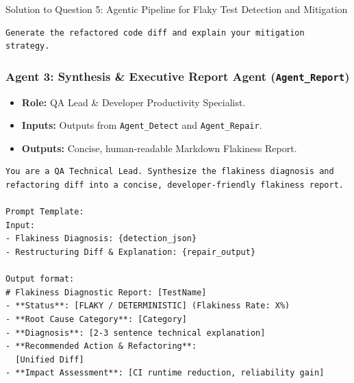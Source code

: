 \documentclass[11pt,a4paper]{article}
\begin{document}
\begin{solutionbox}{Solution to Question 5: Agentic Pipeline for Flaky Test Detection and Mitigation}
\begin{lstlisting}[style=promptstyle]
Generate the refactored code diff and explain your mitigation strategy.
\end{lstlisting}

\subsubsection*{Agent 3: Synthesis \& Executive Report Agent (\texttt{Agent\_Report})}
\begin{itemize}[leftmargin=1.5em,itemsep=1pt]
    \item \textbf{Role:} QA Lead \& Developer Productivity Specialist.
    \item \textbf{Inputs:} Outputs from \texttt{Agent\_Detect} and \texttt{Agent\_Repair}.
    \item \textbf{Outputs:} Concise, human-readable Markdown Flakiness Report.
\end{itemize}

\begin{lstlisting}[style=promptstyle]
You are a QA Technical Lead. Synthesize the flakiness diagnosis and refactoring diff into a concise, developer-friendly flakiness report.

Prompt Template:
Input:
- Flakiness Diagnosis: {detection_json}
- Restructuring Diff & Explanation: {repair_output}

Output format:
# Flakiness Diagnostic Report: [TestName]
- **Status**: [FLAKY / DETERMINISTIC] (Flakiness Rate: X%)
- **Root Cause Category**: [Category]
- **Diagnosis**: [2-3 sentence technical explanation]
- **Recommended Action & Refactoring**:
  [Unified Diff]
- **Impact Assessment**: [CI runtime reduction, reliability gain]
\end{lstlisting}


\end{solutionbox}
\end{document}
